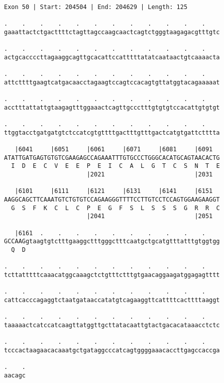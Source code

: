 \documentclass{article}
\begin{document}
\begin{Verbatim}
Exon 50 | Start: 204504 | End: 204629 | Length: 125
 
.    .    .    .    .    .    .    .    .    .    .    .    
gaaattactctgacttttctagttagccaagcaactcagtctgggtaagagacgtttgtc
  
.    .    .    .    .    .    .    .    .    .    .    .    
actgcaccccttagaaggcagttgcacattccatttttatatcaataactgtcaaaacta
  
.    .    .    .    .    .    .    .    .    .    .    .    
attcttttgaagtcatgacaacctagaagtccagtccacagtgttatggtacagaaaaat
  
.    .    .    .    .    .    .    .    .    .    .    .    
acctttattattgtaagagtttggaaactcagttgccctttgtgtgtccacattgtgtgt
  
.    .    .    .    .    .    .    .    .    .    .    .    
ttggtacctgatgatgtctccatcgtgttttgactttgtttgactcatgtgattctttta
  
   |6041     |6051     |6061     |6071     |6081     |6091  
ATATTGATGAGTGTGTCGAAGAGCCAGAAATTTGTGCCCTGGGCACATGCAGTAACACTG
  I  D  E  C  V  E  E  P  E  I  C  A  L  G  T  C  S  N  T  E
                       |2021                         |2031  
  
   |6101     |6111     |6121     |6131     |6141     |6151  
AAGGCAGCTTCAAATGTCTGTGTCCAGAAGGGTTTTCCTTGTCCTCCAGTGGAAGAAGGT
  G  S  F  K  C  L  C  P  E  G  F  S  L  S  S  S  G  R  R  C
                       |2041                         |2051  
  
   |6161  .    .    .    .    .    .    .    .    .    .    
GCCAAGgtaagtgtctttgaaggctttgggctttcaatgctgcatgtttatttgtggtgg
  Q  D                                                      
  
.    .    .    .    .    .    .    .    .    .    .    .    
tcttatttttcaaacatggcaaagctctgtttctttgtgaacaggaagatggagagtttt
  
.    .    .    .    .    .    .    .    .    .    .    .    
cattcacccagaggtctaatgataaccatatgtcagaaggttcattttcacttttaaggt
  
.    .    .    .    .    .    .    .    .    .    .    .    
taaaaactcatccatcaagttatggttgcttatacaattgtactgacacataaacctctc
  
.    .    .    .    .    .    .    .    .    .    .    .    
tcccactaagaacacaaatgctgataggcccatcagtggggaaacaccttgagccaccga
  
.    .
aacagc
\end{Verbatim}
\newpage
\end{document}
